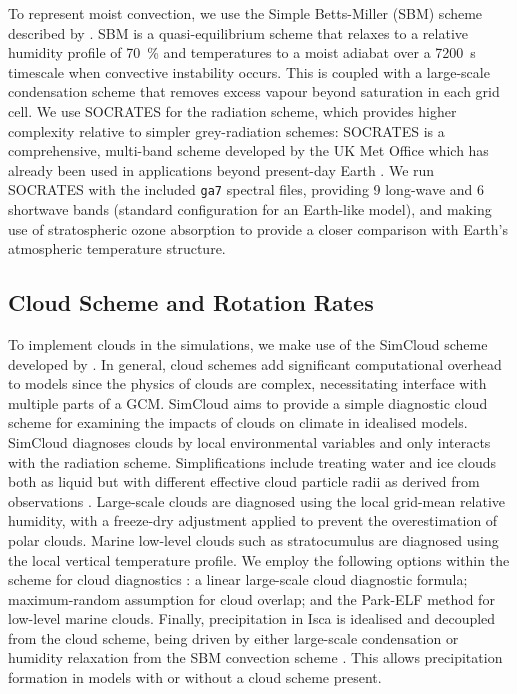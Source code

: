 To represent moist convection, we use the Simple Betts-Miller (SBM) scheme described by \citet{frierson2007-Dynamics}. SBM is a quasi-equilibrium scheme \citep{betts1986-New, betts1986-Newb} that relaxes to a relative humidity profile of \qty{70}{\percent} and temperatures to a moist adiabat over a \SI{7200}{\s} timescale when convective instability occurs. This is coupled with a large-scale condensation scheme that removes excess vapour beyond saturation in each grid cell. We use \textsc{SOCRATES} \citep{edwards1996-Studies, manners2016-SOCRATES} for the radiation scheme, which provides higher complexity relative to simpler grey-radiation schemes: \textsc{SOCRATES} is a comprehensive, multi-band scheme developed by the UK Met Office which has already been used in applications beyond present-day Earth \citep{amundsen2016-UK, way2017-Resolving}. We run \textsc{SOCRATES} with the included \texttt{ga7} spectral files, providing 9 long-wave and 6 shortwave bands (standard configuration for an Earth-like model), and making use of stratospheric ozone absorption to provide a closer comparison with Earth's atmospheric temperature structure.



\subsection{Cloud Scheme and Rotation Rates}
To implement clouds in the simulations, we make use of the SimCloud scheme developed by \citet{liu2021-SimCloud}. In general, cloud schemes add significant computational overhead to models since the physics of clouds are complex, necessitating interface with multiple parts of a GCM. SimCloud aims to provide a simple diagnostic cloud scheme for examining the impacts of clouds on climate in idealised models. SimCloud diagnoses clouds by local environmental variables and only interacts with the radiation scheme. Simplifications include treating water and ice clouds both as liquid but with different effective cloud particle radii as derived from observations \citep{stubenrauch2013-Assessment}. Large-scale clouds are diagnosed using the local grid-mean relative humidity, with a freeze-dry adjustment applied to prevent the overestimation of polar clouds. Marine low-level clouds such as stratocumulus are diagnosed using the local vertical temperature profile. We employ the following options within the scheme for cloud diagnostics \citep[identical to runs from][]{liu2021-SimCloud}: a linear large-scale cloud diagnostic formula; maximum-random assumption for cloud overlap; and the Park-ELF method for low-level marine clouds. Finally, precipitation in Isca is idealised and decoupled from the cloud scheme, being driven by either large-scale condensation \citep{frierson2006-GrayRadiation} or humidity relaxation from the SBM convection scheme \citep{frierson2007-Dynamics}. This allows precipitation formation in models with or without a cloud scheme present.


